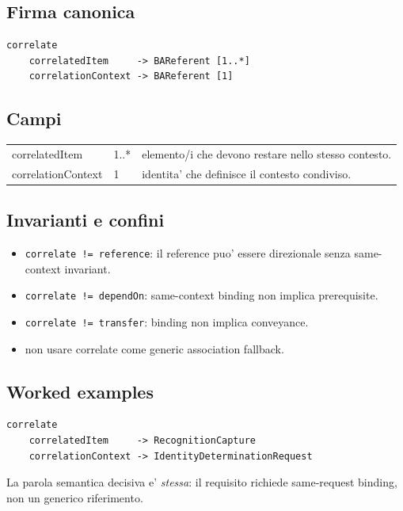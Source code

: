 \documentclass[11pt,a4paper]{article}
\begin{document}
\subsection{Firma canonica}
\begin{lstlisting}
correlate
    correlatedItem     -> BAReferent [1..*]
    correlationContext -> BAReferent [1]
\end{lstlisting}

\subsection{Campi}
\begin{tabularx}{\textwidth}{L{43mm}L{24mm}Y}
\toprule
correlatedItem & 1..* & elemento/i che devono restare nello stesso contesto. \\
correlationContext & 1 & identita' che definisce il contesto condiviso. \\
\bottomrule
\end{tabularx}

\subsection{Invarianti e confini}
\begin{itemize}
  \item \texttt{correlate != reference}: il reference puo' essere direzionale senza same-context invariant.
  \item \texttt{correlate != dependOn}: same-context binding non implica prerequisite.
  \item \texttt{correlate != transfer}: binding non implica conveyance.
  \item non usare correlate come generic association fallback.
\end{itemize}


\subsection{Worked examples}
\begin{ddtaexample}[title={Facial Access - stessa request durante il delivery}]
\begin{lstlisting}
correlate
    correlatedItem     -> RecognitionCapture
    correlationContext -> IdentityDeterminationRequest
\end{lstlisting}
La parola semantica decisiva e' \emph{stessa}: il requisito richiede same-request binding, non un generico riferimento.
\end{ddtaexample}
\end{document}
